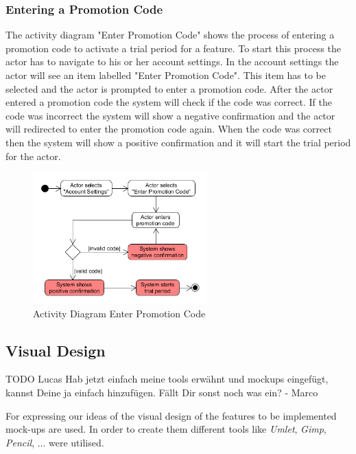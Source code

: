 \subsubsection{Entering a Promotion Code}
\label{sssec:entering_promotion_code}
The activity diagram "Enter Promotion Code" shows the process of entering a promotion code to activate a trial period for a feature. To start this process the actor has to navigate to his or her account settings. In the account settings the actor will see an item labelled "Enter Promotion Code". This item has to be selected and the actor is prompted to enter a promotion code. After the actor entered a promotion code the system will check if the code was correct. If the code was incorrect the system will show a negative confirmation and the actor will redirected to enter the promotion code again. When the code was correct then the system will show a positive confirmation and it will start the trial period for the actor.

\begin{figure}[H]
    \begin{center}
        \includegraphics[width=0.6\textwidth]{images/diagrams/activity_diagrams/ActivityDiagram_EnterPromotionCode.png}
        \caption{Activity Diagram Enter Promotion Code}
        \label{fig:activity_diagram_enter_promotion_code}
    \end{center}
\end{figure}

\subsection{Visual Design}
\label{ssec:visual_design}

TODO Lucas Hab jetzt einfach meine tools erwähnt und mockups eingefügt, kannst Deine ja einfach hinzufügen. Fällt Dir sonst noch was ein? - Marco

For expressing our ideas of the visual design of the features to be implemented mock-ups are used. In order to create them different tools like \textit{Umlet}, \textit{Gimp}, \textit{Pencil}, ... were utilised.

